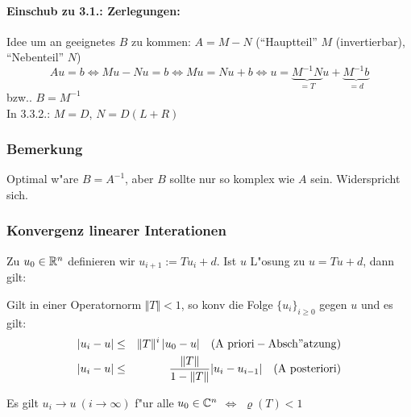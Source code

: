 \documentclass{scrartcl}
\begin{document}
\paragraph*{Einschub zu 3.1.: Zerlegungen:} 
Idee um an geeignetes $B$ zu kommen: $A = M-N$ ("`Hauptteil"' $M$ (invertierbar), "`Nebenteil"' $N$) \\
$$ Au = b \Leftrightarrow Mu - Nu = b \Leftrightarrow Mu = Nu + b \Leftrightarrow u = \underbrace{M^{-1} N}_{=T}u + \underbrace{M^{-1}b}_{=d}$$
bzw.. $B=M^{-1}$ \\
In 3.3.2.: $M=D$, $N = D(L+R)$

\subsubsection*{Bemerkung}
Optimal w"are $B = A^{-1}$, aber $B$ sollte nur so komplex wie $A$ sein. Widerspricht sich.

\subsubsection{Konvergenz linearer Interationen}

\begin{Satz}
Zu $u_0 \in \mathbb{R}^n$ definieren wir $u_{i+1} := T u_i + d$. Ist $u$ L"osung zu $u = Tu + d$, dann gilt:
\begin{1aufz}
\item Gilt in einer Operatornorm $\Vert T \Vert < 1$, so konv die Folge $\{ u_i \}_{i \geq 0}$ gegen $u$ und es gilt:
\begin{eqnarray*}
\vert u_i - u \vert & \leq & \Vert T \Vert ^i \, \vert u_0 - u \vert \quad (\mathrm{A \ priori-Absch"atzung}) \\
\vert u_i - u \vert & \leq & \frac{\Vert T \Vert }{1 - \Vert T \Vert } \vert u_i - u_{i-1} \vert \quad (\mathrm{A \ posteriori})
\end{eqnarray*}
\item Es gilt $u_i \rightarrow u \ (i \rightarrow \infty)$ f"ur alle $u_0 \in \mathbb{C}^n$ $\Leftrightarrow$ $\varrho(T) < 1$
\end{1aufz}
\end{Satz}
\end{document}
